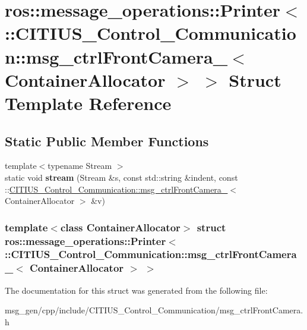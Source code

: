 \hypertarget{structros_1_1message__operations_1_1_printer_3_01_1_1_c_i_t_i_u_s___control___communication_1_1m0d3692df8a57d84fac8e3ef4b4c26515}{\section{ros\-:\-:message\-\_\-operations\-:\-:\-Printer$<$ \-:\-:\-C\-I\-T\-I\-U\-S\-\_\-\-Control\-\_\-\-Communication\-:\-:msg\-\_\-ctrl\-Front\-Camera\-\_\-$<$ \-Container\-Allocator $>$ $>$ \-Struct \-Template \-Reference}
\label{structros_1_1message__operations_1_1_printer_3_01_1_1_c_i_t_i_u_s___control___communication_1_1m0d3692df8a57d84fac8e3ef4b4c26515}
}
\subsection*{\-Static \-Public \-Member \-Functions}
\begin{DoxyCompactItemize}
\item 
\hypertarget{structros_1_1message__operations_1_1_printer_3_01_1_1_c_i_t_i_u_s___control___communication_1_1m0d3692df8a57d84fac8e3ef4b4c26515_a3dfebce002fcce4bd02a65291a3f9cea}{{\footnotesize template$<$typename Stream $>$ }\\static void {\bfseries stream} (\-Stream \&s, const std\-::string \&indent, const \-::\hyperlink{struct_c_i_t_i_u_s___control___communication_1_1msg__ctrl_front_camera__}{\-C\-I\-T\-I\-U\-S\-\_\-\-Control\-\_\-\-Communication\-::msg\-\_\-ctrl\-Front\-Camera\-\_\-}$<$ \-Container\-Allocator $>$ \&v)}\label{structros_1_1message__operations_1_1_printer_3_01_1_1_c_i_t_i_u_s___control___communication_1_1m0d3692df8a57d84fac8e3ef4b4c26515_a3dfebce002fcce4bd02a65291a3f9cea}

\end{DoxyCompactItemize}
\subsubsection*{template$<$class Container\-Allocator$>$ struct ros\-::message\-\_\-operations\-::\-Printer$<$ \-::\-C\-I\-T\-I\-U\-S\-\_\-\-Control\-\_\-\-Communication\-::msg\-\_\-ctrl\-Front\-Camera\-\_\-$<$ Container\-Allocator $>$ $>$}



\-The documentation for this struct was generated from the following file\-:\begin{DoxyCompactItemize}
\item 
msg\-\_\-gen/cpp/include/\-C\-I\-T\-I\-U\-S\-\_\-\-Control\-\_\-\-Communication/msg\-\_\-ctrl\-Front\-Camera.\-h\end{DoxyCompactItemize}
